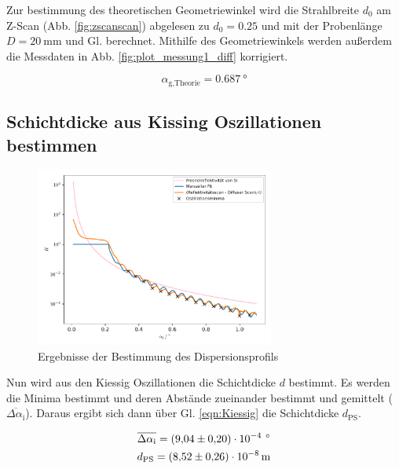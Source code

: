 Zur bestimmung des theoretischen Geometriewinkel wird die Strahlbreite $d_0$ am Z-Scan
(Abb. \ref{fig:zscanscan}) abgelesen zu $d_0=\num{0.25}$ und mit der Probenlänge $D = \SI{20}{\milli\meter}$
und Gl.  berechnet. Mithilfe des Geometriewinkels werden außerdem die Messdaten 
in Abb. \ref{fig:plot_messung1_diff} korrigiert.


\begin{equation*}
  \alpha_\text{g,Theorie} = \SI{0.687}{\degree}
\end{equation*}


\subsection{Schichtdicke aus Kissing Oszillationen bestimmen}

\begin{figure}
  \centering
  \includegraphics[width=0.7\textwidth]{figures/plot_messung2_parrat.pdf}
  \caption{Ergebnisse der Bestimmung des
  Dispersionsprofils}
  \label{fig:plot_messung2_parrat}
\end{figure}

Nun wird aus den Kiessig Oszillationen die Schichtdicke $d$ bestimmt. 
Es werden die Minima bestimmt und deren Abstände zueinander bestimmt und 
gemittelt ($\overline{\Delta\alpha_\text{i}}$).
Daraus ergibt sich dann über Gl. \eqref{eqn:Kiessig} die Schichtdicke $d_\text{PS}$.

\begin{align*}
  \overline{\Delta\alpha_\text{i}} = \SI{9.04+-0.20e-4}{\,\degree} \\
  d_\text{PS} = \SI{8.52+-0.26e-08}{\meter}
\end{align*}

